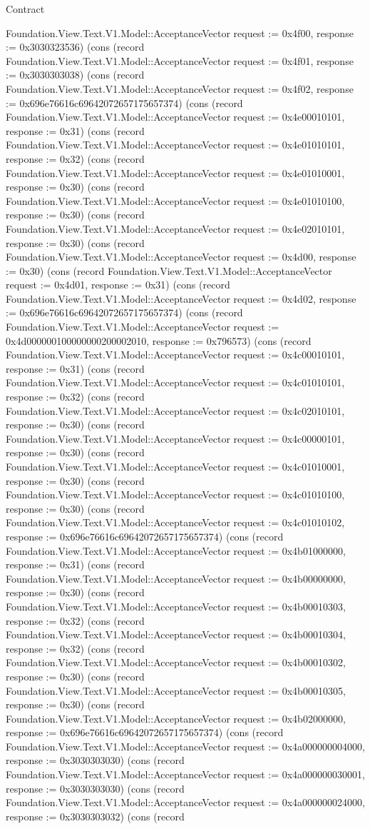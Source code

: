 \begin{lexlean}{Contract}
\begin{semanticmodule}
{Foundation.View.Text.V1.Model::AcceptanceVector {request := 0x4f00, response := 0x3030323536}) (cons (record Foundation.View.Text.V1.Model::AcceptanceVector {request := 0x4f01, response := 0x3030303038}) (cons (record Foundation.View.Text.V1.Model::AcceptanceVector {request := 0x4f02, response := 0x696e76616c69642072657175657374}) (cons (record Foundation.View.Text.V1.Model::AcceptanceVector {request := 0x4e00010101, response := 0x31}) (cons (record Foundation.View.Text.V1.Model::AcceptanceVector {request := 0x4e01010101, response := 0x32}) (cons (record Foundation.View.Text.V1.Model::AcceptanceVector {request := 0x4e01010001, response := 0x30}) (cons (record Foundation.View.Text.V1.Model::AcceptanceVector {request := 0x4e01010100, response := 0x30}) (cons (record Foundation.View.Text.V1.Model::AcceptanceVector {request := 0x4e02010101, response := 0x30}) (cons (record Foundation.View.Text.V1.Model::AcceptanceVector {request := 0x4d00, response := 0x30}) (cons (record Foundation.View.Text.V1.Model::AcceptanceVector {request := 0x4d01, response := 0x31}) (cons (record Foundation.View.Text.V1.Model::AcceptanceVector {request := 0x4d02, response := 0x696e76616c69642072657175657374}) (cons (record Foundation.View.Text.V1.Model::AcceptanceVector {request := 0x4d000000100000000200002010, response := 0x796573}) (cons (record Foundation.View.Text.V1.Model::AcceptanceVector {request := 0x4c00010101, response := 0x31}) (cons (record Foundation.View.Text.V1.Model::AcceptanceVector {request := 0x4c01010101, response := 0x32}) (cons (record Foundation.View.Text.V1.Model::AcceptanceVector {request := 0x4c02010101, response := 0x30}) (cons (record Foundation.View.Text.V1.Model::AcceptanceVector {request := 0x4c00000101, response := 0x30}) (cons (record Foundation.View.Text.V1.Model::AcceptanceVector {request := 0x4c01010001, response := 0x30}) (cons (record Foundation.View.Text.V1.Model::AcceptanceVector {request := 0x4c01010100, response := 0x30}) (cons (record Foundation.View.Text.V1.Model::AcceptanceVector {request := 0x4c01010102, response := 0x696e76616c69642072657175657374}) (cons (record Foundation.View.Text.V1.Model::AcceptanceVector {request := 0x4b01000000, response := 0x31}) (cons (record Foundation.View.Text.V1.Model::AcceptanceVector {request := 0x4b00000000, response := 0x30}) (cons (record Foundation.View.Text.V1.Model::AcceptanceVector {request := 0x4b00010303, response := 0x32}) (cons (record Foundation.View.Text.V1.Model::AcceptanceVector {request := 0x4b00010304, response := 0x32}) (cons (record Foundation.View.Text.V1.Model::AcceptanceVector {request := 0x4b00010302, response := 0x30}) (cons (record Foundation.View.Text.V1.Model::AcceptanceVector {request := 0x4b00010305, response := 0x30}) (cons (record Foundation.View.Text.V1.Model::AcceptanceVector {request := 0x4b02000000, response := 0x696e76616c69642072657175657374}) (cons (record Foundation.View.Text.V1.Model::AcceptanceVector {request := 0x4a000000004000, response := 0x3030303030}) (cons (record Foundation.View.Text.V1.Model::AcceptanceVector {request := 0x4a000000030001, response := 0x3030303030}) (cons (record Foundation.View.Text.V1.Model::AcceptanceVector {request := 0x4a000000024000, response := 0x3030303032}) (cons (record }
\end{semanticmodule}
\end{lexlean}
